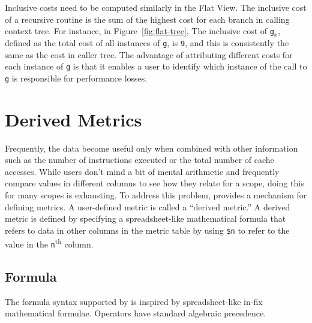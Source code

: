 Inclusive costs need to be computed similarly in the Flat View. The inclusive cost of a recursive routine is the sum of the highest cost for each branch in calling context tree. For instance, in Figure~\ref{fig:flat-tree}, The inclusive cost of \texttt{g$_x$}, defined as the total cost of all instances of \texttt{g}, is \texttt{9}, and this is consistently the same as the cost in caller tree. The advantage of attributing different costs for each instance of \texttt{g} is that it enables a user to identify which instance of the call to \texttt{g} is responsible for performance losses.



\section{Derived Metrics}

Frequently, the data become useful only when combined with other information such as the number of instructions executed or the total number of cache accesses.
While users don't mind a bit of mental arithmetic and frequently compare values in different columns to see how they relate for a scope, doing this for many scopes is exhausting.
To address this problem, \hpcviewer{} provides a mechanism for defining metrics.
A user-defined metric is called a ``derived metric.''
A derived metric is defined by specifying a spreadsheet-like mathematical formula that refers to data in other columns in the metric table by using \texttt{\$n} to refer to the value in the \texttt{n}\textsuperscript{th} column.


\subsection{Formula}

The formula syntax supported by \hpcviewer{} is inspired by spreadsheet-like in-fix mathematical formulae.
Operators have standard algebraic precedence.
%

